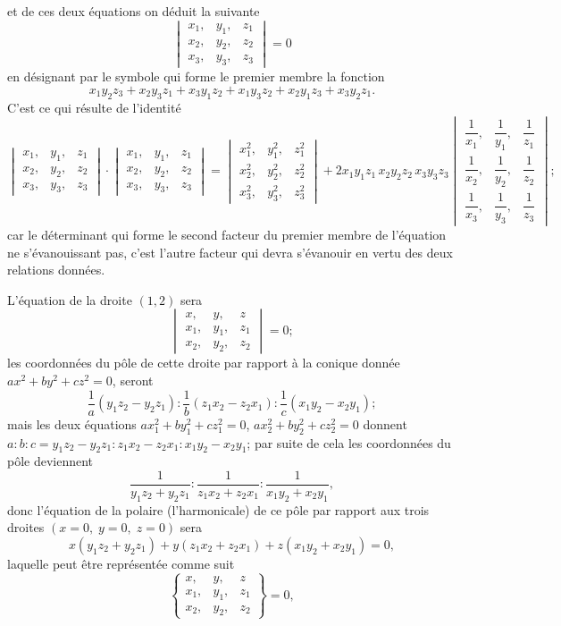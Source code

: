 \documentclass[11pt,a4paper]{article}
\begin{document}
et de ces deux équations on déduit la suivante
\[
\begin{vmatrix}
x_1, & y_1, & z_1 \\
x_2, & y_2, & z_2 \\
x_3, & y_3, & z_3
\end{vmatrix} = 0
\]
en désignant par le symbole qui forme le premier membre la fonction
\[
x_1 y_2 z_3 + x_2 y_3 z_1 + x_3 y_1 z_2 + x_1 y_3 z_2 + x_2 y_1 z_3 + x_3 y_2 z_1.
\]
C'est ce qui résulte de l'identité
\[
\begin{vmatrix}
x_1, & y_1, & z_1 \\
x_2, & y_2, & z_2 \\
x_3, & y_3, & z_3
\end{vmatrix}
\cdot
\begin{vmatrix}
x_1, & y_1, & z_1 \\
x_2, & y_2, & z_2 \\
x_3, & y_3, & z_3
\end{vmatrix}
=
\begin{vmatrix}
x_1^2, & y_1^2, & z_1^2 \\
x_2^2, & y_2^2, & z_2^2 \\
x_3^2, & y_3^2, & z_3^2
\end{vmatrix}
+ 2 x_1 y_1 z_1 \, x_2 y_2 z_2 \, x_3 y_3 z_3
\begin{vmatrix}
\dfrac{1}{x_1}, & \dfrac{1}{y_1}, & \dfrac{1}{z_1} \\[2pt]
\dfrac{1}{x_2}, & \dfrac{1}{y_2}, & \dfrac{1}{z_2} \\[2pt]
\dfrac{1}{x_3}, & \dfrac{1}{y_3}, & \dfrac{1}{z_3}
\end{vmatrix};
\]
car le déterminant qui forme le second facteur du premier membre de l'équation ne s'évanouissant pas, c'est l'autre facteur qui devra s'évanouir en vertu des deux relations données.

L'équation de la droite $(1,2)$ sera
\[
\begin{vmatrix}
x, & y, & z \\
x_1, & y_1, & z_1 \\
x_2, & y_2, & z_2
\end{vmatrix} = 0;
\]
les coordonnées du pôle de cette droite par rapport à la conique donnée $ax^2 + by^2 + cz^2 = 0$, seront
\[
\frac{1}{a}(y_1 z_2 - y_2 z_1) : \frac{1}{b}(z_1 x_2 - z_2 x_1) : \frac{1}{c}(x_1 y_2 - x_2 y_1);
\]
mais les deux équations $a x_1^2 + b y_1^2 + c z_1^2 = 0$, $a x_2^2 + b y_2^2 + c z_2^2 = 0$ donnent $a : b : c = y_1 z_2 - y_2 z_1 : z_1 x_2 - z_2 x_1 : x_1 y_2 - x_2 y_1$; par suite de cela les coordonnées du pôle deviennent
\[
\frac{1}{y_1 z_2 + y_2 z_1} : \frac{1}{z_1 x_2 + z_2 x_1} : \frac{1}{x_1 y_2 + x_2 y_1},
\]
donc l'équation de la polaire (l'harmonicale) de ce pôle par rapport aux trois droites $(x=0,\; y=0,\; z=0)$ sera
\[
x(y_1 z_2 + y_2 z_1) + y(z_1 x_2 + z_2 x_1) + z(x_1 y_2 + x_2 y_1) = 0,
\]
laquelle peut être représentée comme suit
\[
\begin{Bmatrix}
x, & y, & z \\
x_1, & y_1, & z_1 \\
x_2, & y_2, & z_2
\end{Bmatrix} = 0,
\]
\end{document}
